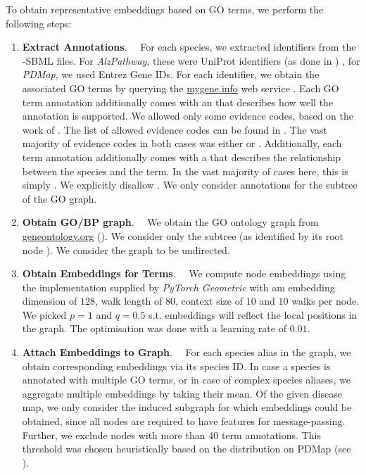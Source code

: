 \documentclass[
	fontsize=10pt, %
	twoside=false, %
	secnumdepth=1, %
  toc=indentunnumbered %
]{kaobook}
\begin{document}
To obtain representative embeddings based on GO terms, we perform the following
steps:
\begin{enumerate}
\item \textbf{Extract Annotations}.~~ For each species, we extracted identifiers
  from the -SBML files. For \textit{AlzPathway}, these
  were UniProt identifiers (as done in \cite{ostaszewski_ClusteringApproachesVisual_2018})
  , for \textit{PDMap}, we used Entrez Gene IDs.
%
  For each identifier, we obtain the associated GO terms by querying the
  \href{https://mygene.info/}{mygene.info} web service
  \cite{xin_HighperformanceWebServices_2016}. Each GO term annotation
  additionally comes with an  that describes how well the
  annotation is supported. We allowed only some evidence codes, based on the
  work of \citeauthor{ruiz_identification_2021} \cite{ruiz_identification_2021}.
  The list of allowed evidence codes can be found in .
  The vast majority of evidence codes in both cases was either  or
  .
%
  Additionally, each term annotation additionally comes with a 
  that describes the relationship between the species and the term. In the vast
  majority of cases here, this is simply . We explicitly
  disallow .
%
  We only consider annotations for the  subtree of the
  GO graph. 
%
\item \textbf{Obtain GO/BP graph}.~~ We obtain the GO ontology graph from
  \href{http://geneontology.org/docs/download-ontology/}{geneontology.org}
  (). We consider only the  subtree (as
  identified by its root node ). We consider the graph to be undirected.
%
\item \textbf{Obtain Embeddings for Terms}.~~ We compute node embeddings using
  the  implementation supplied by \textit{PyTorch Geometric} with
  am embedding dimension of $128$, walk length of $80$, context size of $10$ and 
  $10$ walks per node. We picked $p=1$ and $q=0.5$ s.t. embeddings will reflect
  the local positions in the graph. The optimisation was done with a learning
  rate of $0.01$.
\item \textbf{Attach Embeddings to Graph}.~~ For each species alias in the
  graph, we obtain corresponding embeddings via its species ID. In case a
  species is annotated with multiple GO terms, or in case of complex species
  aliases, we aggregate multiple embeddings by taking their mean. Of the given
  disease map, we only consider the induced subgraph for which embeddings could
  be obtained, since all nodes are required to have features for
  message-passing. Further, we exclude nodes with more than $40$ term
  annotations. This threshold was chosen heuristically based on the distribution
  on PDMap (see ).
 \end{enumerate}
\end{document}
